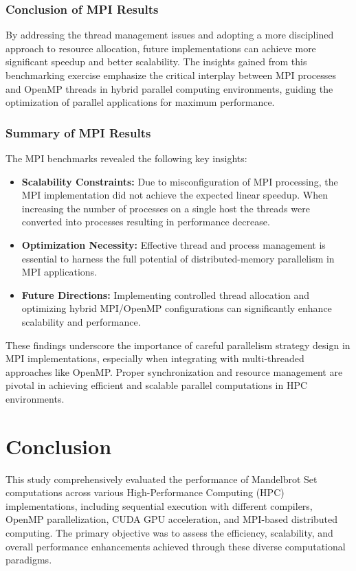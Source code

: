 \documentclass[
	report, %
	11pt, %
]{CSUniSchoolLabReport}
\newcounter{ct}
\begin{document}
\subsubsection{Conclusion of MPI Results}

By addressing the thread management issues and adopting a more disciplined approach to resource allocation, future implementations can achieve more significant speedup and better scalability. The insights gained from this benchmarking exercise emphasize the critical interplay between MPI processes and OpenMP threads in hybrid parallel computing environments, guiding the optimization of parallel applications for maximum performance.

\subsubsection{Summary of MPI Results}

The MPI benchmarks revealed the following key insights:

\begin{itemize}
	\item \textbf{Scalability Constraints:} Due to misconfiguration of MPI processing, the MPI implementation did not achieve the expected linear speedup. When increasing the number of processes on a single host the threads were converted into processes resulting in performance decrease.
	\item \textbf{Optimization Necessity:} Effective thread and process management is essential to harness the full potential of distributed-memory parallelism in MPI applications.
	\item \textbf{Future Directions:} Implementing controlled thread allocation and optimizing hybrid MPI/OpenMP configurations can significantly enhance scalability and performance.
\end{itemize}

These findings underscore the importance of careful parallelism strategy design in MPI implementations, especially when integrating with multi-threaded approaches like OpenMP. Proper synchronization and resource management are pivotal in achieving efficient and scalable parallel computations in HPC environments.


\section{Conclusion}

This study comprehensively evaluated the performance of Mandelbrot Set computations across various High-Performance Computing (HPC) implementations, including sequential execution with different compilers, OpenMP parallelization, CUDA GPU acceleration, and MPI-based distributed computing. The primary objective was to assess the efficiency, scalability, and overall performance enhancements achieved through these diverse computational paradigms.
\end{document}

